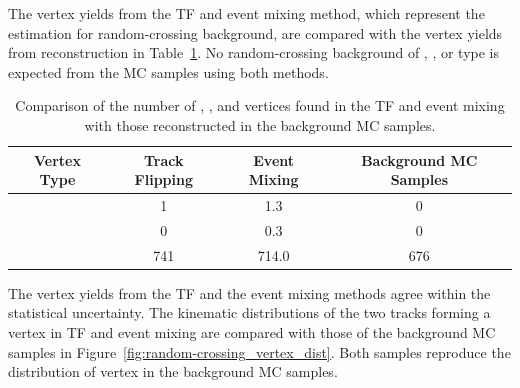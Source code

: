 The vertex yields from the TF and event mixing method, which represent the estimation for random-crossing background, are compared with the vertex yields from reconstruction in Table~\ref{table:random_vertex_count}. No random-crossing background of \mumu, \ee, or \emu type is expected from the MC samples using both methods. 
 
\begin{table}[!htb]
  \centering
  \begin{tabular}{ c  c c c }
    \hline
    \hline
	Vertex Type					& Track Flipping	        & Event Mixing	        & Background MC Samples \\
    \hline
	\mux						&	1						&	1.3 				&	0					\\
	\ex						    &	0						&	0.3 				&	0					\\
	\xx						    &	741 					&	714.0				&	676 				\\
    \hline
    \hline
  \end{tabular}
  \caption{Comparison of the number of \mux, \ex, and \xx vertices found in the TF and event mixing with those reconstructed in the background MC samples.}
  \label{table:random_vertex_count}
\end{table}

The \xx vertex yields from the TF and the event mixing methods agree within the statistical uncertainty. The kinematic distributions of the two tracks forming a vertex in TF and event mixing are compared with those of the background MC samples in Figure~\ref{fig:random-crossing_vertex_dist}. Both samples reproduce the distribution of vertex in the background MC samples.

